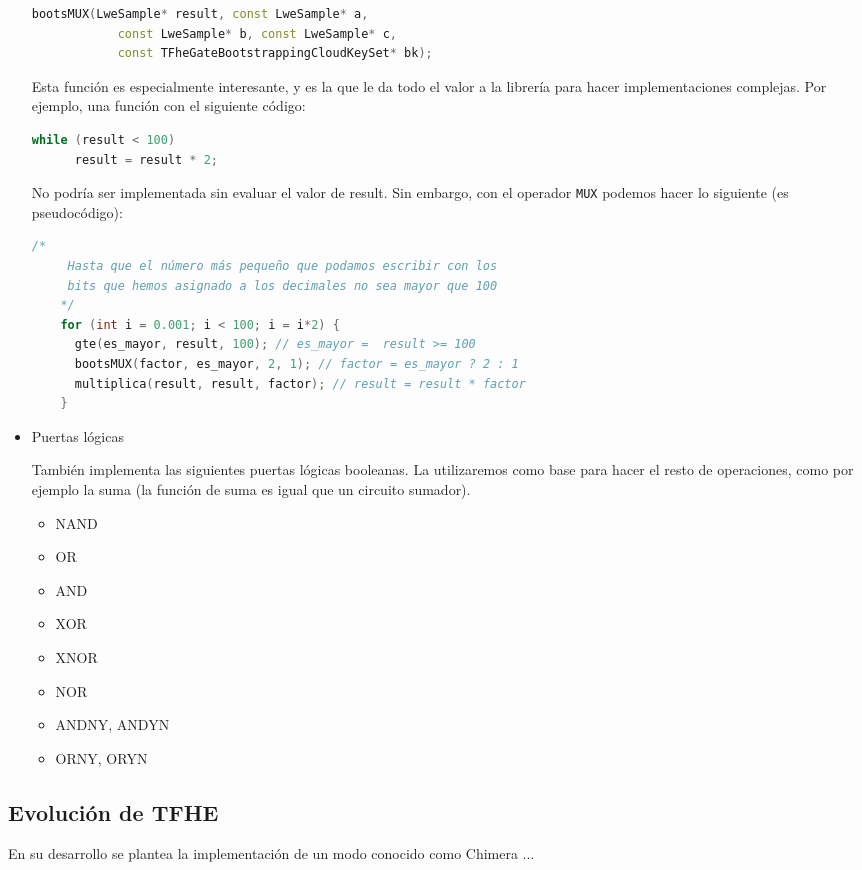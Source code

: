 \begin{itemize}
  \begin{lstlisting}[language=c++]
    bootsMUX(LweSample* result, const LweSample* a,
            const LweSample* b, const LweSample* c,
            const TFheGateBootstrappingCloudKeySet* bk);
  \end{lstlisting}

  Esta función es especialmente interesante, y es la que le da todo el valor a la librería para hacer implementaciones complejas. Por ejemplo, una función con el siguiente código:

  \begin{lstlisting}[language=c++]
    while (result < 100)
      result = result * 2;
  \end{lstlisting}

  No podría ser implementada sin evaluar el valor de result. Sin embargo, con el operador \verb|MUX| podemos hacer lo siguiente (es pseudocódigo):

  \begin{lstlisting}[language=c++]
    /*
     Hasta que el número más pequeño que podamos escribir con los
     bits que hemos asignado a los decimales no sea mayor que 100
    */
    for (int i = 0.001; i < 100; i = i*2) {
      gte(es_mayor, result, 100); // es_mayor =  result >= 100
      bootsMUX(factor, es_mayor, 2, 1); // factor = es_mayor ? 2 : 1
      multiplica(result, result, factor); // result = result * factor
    }
  \end{lstlisting}

  \item Puertas lógicas

  También implementa las siguientes puertas lógicas booleanas. La utilizaremos como base para hacer el resto de operaciones, como por ejemplo la suma (la función de suma es igual que un circuito sumador).

  \begin{itemize}
    \item NAND

    \item OR

    \item AND

    \item XOR

    \item XNOR

    \item NOR

    \item ANDNY, ANDYN

    \item ORNY, ORYN

  \end{itemize}

\end{itemize}

\subsection{Evolución de TFHE}

En su desarrollo se plantea la implementación de un modo conocido como Chimera ...
